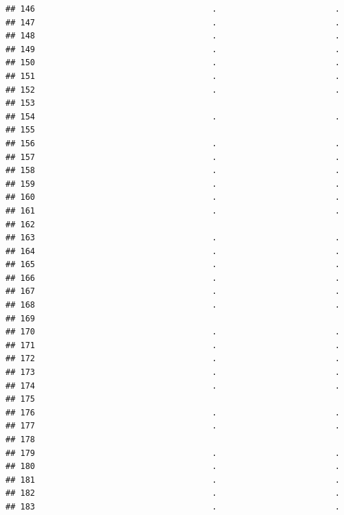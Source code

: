 \documentclass[
]{article}
\begin{document}
\begin{verbatim}
## 146                                    .                        .
## 147                                    .                        .
## 148                                    .                        .
## 149                                    .                        .
## 150                                    .                        .
## 151                                    .                        .
## 152                                    .                        .
## 153                                                              
## 154                                    .                        .
## 155                                                              
## 156                                    .                        .
## 157                                    .                        .
## 158                                    .                        .
## 159                                    .                        .
## 160                                    .                        .
## 161                                    .                        .
## 162                                                              
## 163                                    .                        .
## 164                                    .                        .
## 165                                    .                        .
## 166                                    .                        .
## 167                                    .                        .
## 168                                    .                        .
## 169                                                              
## 170                                    .                        .
## 171                                    .                        .
## 172                                    .                        .
## 173                                    .                        .
## 174                                    .                        .
## 175                                                              
## 176                                    .                        .
## 177                                    .                        .
## 178                                                              
## 179                                    .                        .
## 180                                    .                        .
## 181                                    .                        .
## 182                                    .                        .
## 183                                    .                        .

\end{verbatim}
\end{document}
